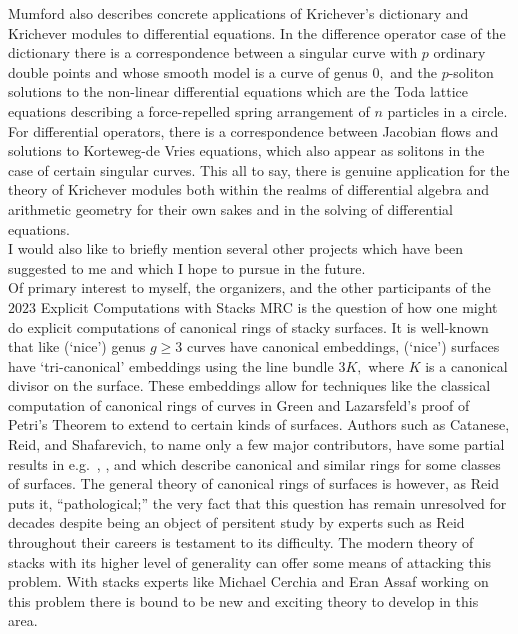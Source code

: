 \documentclass[12pt]{amsart}
\begin{document}
	Mumford also describes concrete applications of Krichever's dictionary and Krichever modules to differential equations. In the difference operator case of the dictionary there is a correspondence between a singular curve with $p$ ordinary double points and whose smooth model is a curve of genus $0,$ and the $p$-soliton solutions to the non-linear differential equations which are the Toda lattice equations describing a force-repelled spring arrangement of $n$ particles in a circle. For differential operators, there is a correspondence between Jacobian flows and solutions to Korteweg-de Vries equations, which also appear as solitons in the case of certain singular curves. This all to say, there is genuine application for the theory of Krichever modules both within the realms of differential algebra and arithmetic geometry for their own sakes and in the solving of differential equations.\\
	
	I would also like to briefly mention several other projects which have been suggested to me and which I hope to pursue in the future.\\
	
	Of primary interest to myself, the organizers, and the other participants of the $2023$ Explicit Computations with Stacks MRC is the question of how one might do explicit computations of canonical rings of stacky surfaces. It is well-known that like (`nice') genus $g\geq 3$ curves have canonical embeddings, (`nice') surfaces have `tri-canonical' embeddings using the line bundle $3K,$ where $K$ is a canonical divisor on the surface. These embeddings allow for techniques like the classical computation of canonical rings of curves in Green and Lazarsfeld's proof of Petri's Theorem \cite{Green-Laz-simple-Petri} to extend to certain kinds of surfaces. Authors such as Catanese, Reid, and Shafarevich, to name only a few major contributors, have some partial results in e.g.\ \cite{MRpreprint}, \cite{MRpreprint2}, \cite{Shafarevich} and \cite{CataneseFabrizioFranciosiHulekReid} which describe canonical and similar rings for some classes of surfaces. The general theory of canonical rings of surfaces is however, as Reid puts it, ``pathological;'' the very fact that this question has remain unresolved for decades despite being an object of persitent study by experts such as Reid throughout their careers is testament to its difficulty. The modern theory of stacks with its higher level of generality can offer some means of attacking this problem. With stacks experts like Michael Cerchia and Eran Assaf working on this problem there is bound to be new and exciting theory to develop in this area.\\
	
\end{document}
